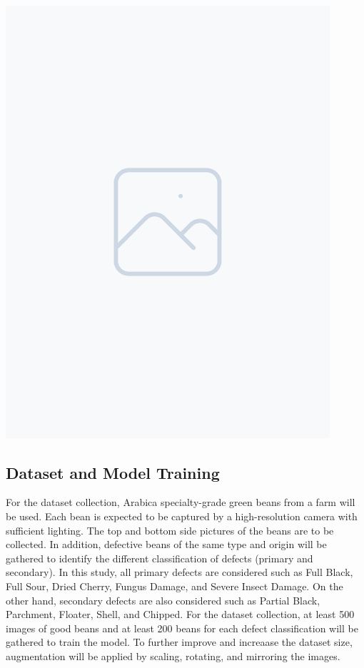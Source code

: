 \includegraphics[width=0.9\textwidth]{figure/placeholder.png} 

\subsection{Dataset and Model Training}
For the dataset collection, Arabica specialty-grade green beans from a farm will be used. Each bean is expected to be captured by a high-resolution camera with sufficient lighting. The top and bottom side pictures of the beans are to be collected. In addition, defective beans of the same type and origin will be gathered to identify the different classification of defects (primary and secondary). In this study, all primary defects are considered such as Full Black, Full Sour, Dried Cherry, Fungus Damage, and Severe Insect Damage. On the other hand, secondary defects are also considered such as Partial Black, Parchment, Floater, Shell, and Chipped. For the dataset collection, at least 500 images of good beans and at least 200 beans for each defect classification will be gathered to train the model. To further improve and increaase the dataset size, augmentation will be applied by scaling, rotating, and mirroring the images. 

